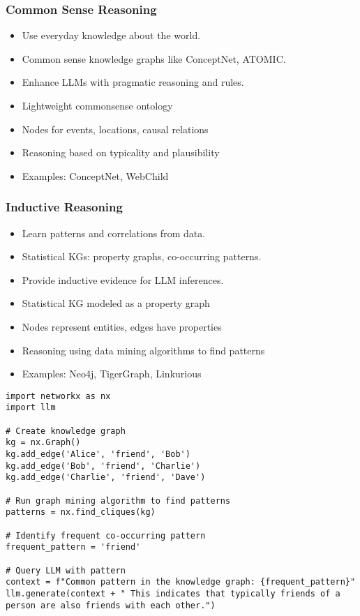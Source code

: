 \begin{frame}[fragile]
\frametitle{Common Sense Reasoning}
\begin{itemize}
    \item Use everyday knowledge about the world.
    \item Common sense knowledge graphs like ConceptNet, ATOMIC.
    \item Enhance LLMs with pragmatic reasoning and rules.
    \item Lightweight commonsense ontology
    \item Nodes for events, locations, causal relations
    \item Reasoning based on typicality and plausibility
    \item Examples: ConceptNet, WebChild
\end{itemize}
\end{frame}

\begin{frame}[fragile]
\frametitle{Inductive Reasoning}
\begin{itemize}
    \item Learn patterns and correlations from data.
    \item Statistical KGs: property graphs, co-occurring patterns.
    \item Provide inductive evidence for LLM inferences.
	\item Statistical KG modeled as a property graph
	\item Nodes represent entities, edges have properties
	\item Reasoning using data mining algorithms to find patterns
	\item Examples: Neo4j, TigerGraph, Linkurious
\end{itemize}

\begin{lstlisting}
import networkx as nx
import llm

# Create knowledge graph
kg = nx.Graph()
kg.add_edge('Alice', 'friend', 'Bob') 
kg.add_edge('Bob', 'friend', 'Charlie')
kg.add_edge('Charlie', 'friend', 'Dave')

# Run graph mining algorithm to find patterns
patterns = nx.find_cliques(kg) 

# Identify frequent co-occurring pattern
frequent_pattern = 'friend' 

# Query LLM with pattern  
context = f"Common pattern in the knowledge graph: {frequent_pattern}"
llm.generate(context + " This indicates that typically friends of a person are also friends with each other.")
\end{lstlisting}
\end{frame}

